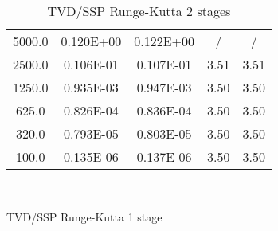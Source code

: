 \documentclass[pdftex,preprint,3p,times,numbers]{elsarticle}
\begin{document}
\begin{table}[!ht]
\begin{subtable}[b]{0.45\textwidth}
{\begin{tabular}{ccccc}
      \hline
      5000.0          &  0.120E+00    &  0.122E+00    & /             & /             \\
      2500.0          &  0.106E-01    &  0.107E-01    & 3.51          & 3.51          \\
      1250.0          &  0.935E-03    &  0.947E-03    & 3.50          & 3.50          \\
       625.0          &  0.826E-04    &  0.836E-04    & 3.50          & 3.50          \\
       320.0          &  0.793E-05    &  0.803E-05    & 3.50          & 3.50          \\
       100.0          &  0.135E-06    &  0.137E-06    & 3.50          & 3.50          \\
      \bottomrule
    \end{tabular}}
  \end{subtable}\\
  \begin{subtable}[b]{0.45\textwidth}
    \centering
    \caption{TVD/SSP Runge-Kutta 1 stage}\label{tab:oscillation-tvd-rk-1}
  \end{subtable}\quad%
  \begin{subtable}[b]{0.45\textwidth}
    \centering
    \caption{TVD/SSP Runge-Kutta 2 stages}\label{tab:oscillation-tvd-rk-2}
\end{subtable}
\end{table}
\end{document}
